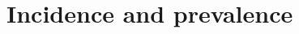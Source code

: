 \documentclass[thesis.tex]{subfiles}
\begin{document}
\chapter{Incidence and prevalence} \label{incidence-prevalence}
\end{document}
